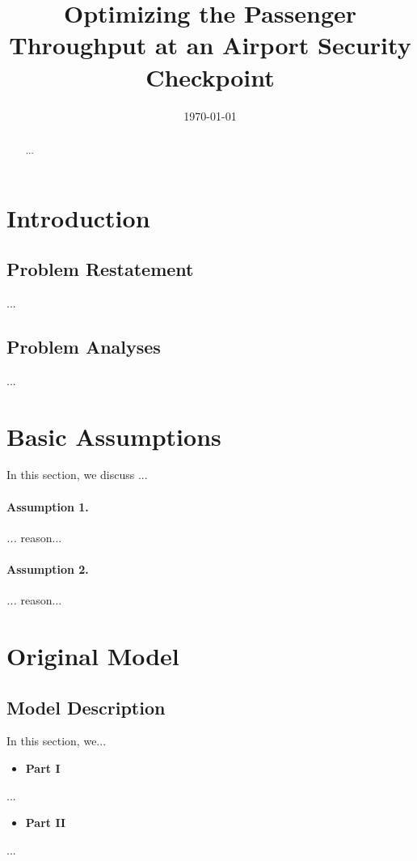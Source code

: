 \documentclass{mcmthesis}
\begin{document}
\title{Optimizing the Passenger Throughput at an Airport Security Checkpoint}

\date{\today}
	\begin{abstract}
		...
	\end{abstract}

\maketitle

\newpage

\tableofcontents

\newpage

\section{Introduction}

\subsection{Problem Restatement}
	...
\subsection{Problem Analyses}
	...
\section{Basic Assumptions}
	In this section, we discuss ... 
	\paragraph{Assumption 1.}\label{as1}
		\emph{...}
		reason...
	
	\paragraph{Assumption 2.}
		\emph{...}
		reason...
	
\section{Original Model}
\subsection{Model Description}
	In this section, we...
	\begin{itemize}
		\item \textbf{Part I}
	\end{itemize}
	...
	\begin{itemize}
		\item \textbf{Part II}
	\end{itemize}
	...
\end{document}

